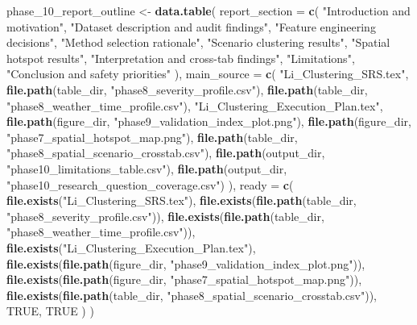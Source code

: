 \documentclass[
]{article}
\newenvironment{Shaded}{\begin{snugshade}}{\end{snugshade}}
\newcommand{\AttributeTok}[1]{\textcolor[rgb]{0.13,0.29,0.53}{#1}}
\newcommand{\ConstantTok}[1]{\textcolor[rgb]{0.56,0.35,0.01}{#1}}
\newcommand{\FunctionTok}[1]{\textcolor[rgb]{0.13,0.29,0.53}{\textbf{#1}}}
\newcommand{\NormalTok}[1]{#1}
\newcommand{\OtherTok}[1]{\textcolor[rgb]{0.56,0.35,0.01}{#1}}
\newcommand{\StringTok}[1]{\textcolor[rgb]{0.31,0.60,0.02}{#1}}
\begin{document}
\begin{Shaded}
\begin{Highlighting}[]
\NormalTok{phase\_10\_report\_outline }\OtherTok{\textless{}{-}} \FunctionTok{data.table}\NormalTok{(}
  \AttributeTok{report\_section =} \FunctionTok{c}\NormalTok{(}
    \StringTok{"Introduction and motivation"}\NormalTok{,}
    \StringTok{"Dataset description and audit findings"}\NormalTok{,}
    \StringTok{"Feature engineering decisions"}\NormalTok{,}
    \StringTok{"Method selection rationale"}\NormalTok{,}
    \StringTok{"Scenario clustering results"}\NormalTok{,}
    \StringTok{"Spatial hotspot results"}\NormalTok{,}
    \StringTok{"Interpretation and cross{-}tab findings"}\NormalTok{,}
    \StringTok{"Limitations"}\NormalTok{,}
    \StringTok{"Conclusion and safety priorities"}
\NormalTok{  ),}
  \AttributeTok{main\_source =} \FunctionTok{c}\NormalTok{(}
    \StringTok{"Li\_Clustering\_SRS.tex"}\NormalTok{,}
    \FunctionTok{file.path}\NormalTok{(table\_dir, }\StringTok{"phase8\_severity\_profile.csv"}\NormalTok{),}
    \FunctionTok{file.path}\NormalTok{(table\_dir, }\StringTok{"phase8\_weather\_time\_profile.csv"}\NormalTok{),}
    \StringTok{"Li\_Clustering\_Execution\_Plan.tex"}\NormalTok{,}
    \FunctionTok{file.path}\NormalTok{(figure\_dir, }\StringTok{"phase9\_validation\_index\_plot.png"}\NormalTok{),}
    \FunctionTok{file.path}\NormalTok{(figure\_dir, }\StringTok{"phase7\_spatial\_hotspot\_map.png"}\NormalTok{),}
    \FunctionTok{file.path}\NormalTok{(table\_dir, }\StringTok{"phase8\_spatial\_scenario\_crosstab.csv"}\NormalTok{),}
    \FunctionTok{file.path}\NormalTok{(output\_dir, }\StringTok{"phase10\_limitations\_table.csv"}\NormalTok{),}
    \FunctionTok{file.path}\NormalTok{(output\_dir, }\StringTok{"phase10\_research\_question\_coverage.csv"}\NormalTok{)}
\NormalTok{  ),}
  \AttributeTok{ready =} \FunctionTok{c}\NormalTok{(}
    \FunctionTok{file.exists}\NormalTok{(}\StringTok{"Li\_Clustering\_SRS.tex"}\NormalTok{),}
    \FunctionTok{file.exists}\NormalTok{(}\FunctionTok{file.path}\NormalTok{(table\_dir, }\StringTok{"phase8\_severity\_profile.csv"}\NormalTok{)),}
    \FunctionTok{file.exists}\NormalTok{(}\FunctionTok{file.path}\NormalTok{(table\_dir, }\StringTok{"phase8\_weather\_time\_profile.csv"}\NormalTok{)),}
    \FunctionTok{file.exists}\NormalTok{(}\StringTok{"Li\_Clustering\_Execution\_Plan.tex"}\NormalTok{),}
    \FunctionTok{file.exists}\NormalTok{(}\FunctionTok{file.path}\NormalTok{(figure\_dir, }\StringTok{"phase9\_validation\_index\_plot.png"}\NormalTok{)),}
    \FunctionTok{file.exists}\NormalTok{(}\FunctionTok{file.path}\NormalTok{(figure\_dir, }\StringTok{"phase7\_spatial\_hotspot\_map.png"}\NormalTok{)),}
    \FunctionTok{file.exists}\NormalTok{(}\FunctionTok{file.path}\NormalTok{(table\_dir, }\StringTok{"phase8\_spatial\_scenario\_crosstab.csv"}\NormalTok{)),}
    \ConstantTok{TRUE}\NormalTok{,}
    \ConstantTok{TRUE}
\NormalTok{  )}
\NormalTok{)}


\end{Highlighting}
\end{Shaded}
\end{document}
